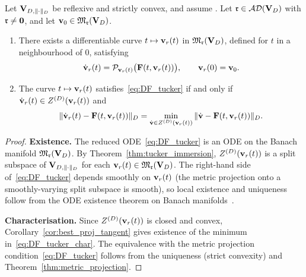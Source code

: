 \begin{theorem}
\label{thm:DF_tucker}
Let $\mathbf{V}_{D,\|\cdot\|_D}$ be reflexive and strictly convex, and assume \condINJ.
Let $\mathfrak{r} \in \mathcal{AD}(\mathbf{V}_D)$ with $\mathfrak{r} \neq \mathbf{0}$, and let
$\mathbf{v}_0 \in \mathfrak{M}_{\mathfrak{r}}(\mathbf{V}_D)$.
\begin{enumerate}
\item[\textup{(Existence)}] There exists a differentiable curve
    $t \mapsto \mathbf{v}_r(t)$ in $\mathfrak{M}_{\mathfrak{r}}(\mathbf{V}_D)$, defined for $t$ in a
    neighbourhood of $0$, satisfying
    \begin{equation}
    \label{eq:DF_tucker}
        \dot{\mathbf{v}}_r(t) = \mathcal{P}_{\mathbf{v}_r(t)}\bigl(\mathbf{F}(t, \mathbf{v}_r(t))\bigr),
        \qquad \mathbf{v}_r(0) = \mathbf{v}_0.
    \end{equation}

\item[\textup{(Characterisation)}] The curve $t \mapsto \mathbf{v}_r(t)$
    satisfies~\eqref{eq:DF_tucker} if and only if $\dot{\mathbf{v}}_r(t)
    \in Z^{(D)}(\mathbf{v}_r(t))$ and
    \begin{equation}
    \label{eq:DF_tucker_char}
        \|\dot{\mathbf{v}}_r(t) - \mathbf{F}(t, \mathbf{v}_r(t))\|_D
        = \min_{\dot{\mathbf{v}} \in Z^{(D)}(\mathbf{v}_r(t))}
        \|\dot{\mathbf{v}} - \mathbf{F}(t, \mathbf{v}_r(t))\|_D.
    \end{equation}
\end{enumerate}
\end{theorem}

\begin{proof}
\textbf{Existence.} The reduced ODE~\eqref{eq:DF_tucker} is an ODE on
the Banach manifold $\mathfrak{M}_{\mathfrak{r}}(\mathbf{V}_D)$. By
Theorem~\ref{thm:tucker_immersion}, $Z^{(D)}(\mathbf{v}_r(t))$ is a split
subspace of $\mathbf{V}_{D,\|\cdot\|_D}$ for each $\mathbf{v}_r(t) \in \mathfrak{M}_{\mathfrak{r}}(\mathbf{V}_D)$.
The right-hand side of~\eqref{eq:DF_tucker} depends smoothly on
$\mathbf{v}_r(t)$ (the metric projection onto a smoothly-varying split
subspace is smooth), so local existence and uniqueness follow from the
ODE existence theorem on Banach manifolds~\cite[Theorem~4.1.5]{Lang1999}.

\textbf{Characterisation.} Since $Z^{(D)}(\mathbf{v}_r(t))$ is closed and
convex, Corollary~\ref{cor:best_proj_tangent} gives existence of the
minimum in~\eqref{eq:DF_tucker_char}. The equivalence with the metric
projection condition~\eqref{eq:DF_tucker} follows from the uniqueness
(strict convexity) and Theorem~\ref{thm:metric_projection}.
\end{proof}

